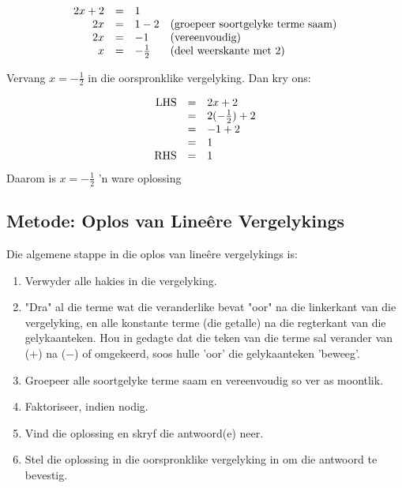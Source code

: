 \begin{equation*}
  \begin{array}{ccll}\hfill 2x+2& =& 1\hfill \\ 
      \hfill 2x& =& 1-2\hfill & \mbox{(groepeer soortgelyke terme saam)}\hfill \\ 
      \hfill 2x& =& -1\hfill & \mbox{(vereenvoudig)}\hfill \\
\hfill x&=& -\frac{1}{2} & \mbox{(deel weerskante met $2$)} \hfill
  \end{array}
\end{equation*}

\begin{equation*}

\end{equation*}
Vervang  $x=-\frac{1}{2}$ in die oorspronklike vergelyking. Dan kry ons:

\begin{equation*}
    \begin{array}{ccl}\hfill \mbox{LHS}& =& 2x+2\hfill \\
	  & =& 2(-\frac{1}{2})+2\hfill \\
	  & =& -1+2\hfill \\
	  & =& 1\hfill \\
	  \hfill \mbox{RHS}& =& 1\hfill \\
    \end{array}
\end{equation*}
Daarom is $x = -\frac{1}{2}$ 'n ware oplossing


\subsection*{Metode: Oplos van Lineêre Vergelykings}

Die algemene stappe in die oplos van lineêre vergelykings is:
\begin{enumerate}[noitemsep, label=\textbf{\arabic*}. ] 
    \item Verwyder alle hakies in die vergelyking.
    \item "Dra" al die terme wat die veranderlike bevat "oor" na die linkerkant van die vergelyking, en alle konstante terme (die getalle) na die regterkant van die gelykaanteken. Hou in gedagte dat die teken van die terme sal verander van (+) na (−) of omgekeerd, soos hulle ’oor’ die gelykaanteken ’beweeg’.
    \item Groepeer alle soortgelyke terme saam en vereenvoudig so ver as moontlik.
\item Faktoriseer, indien nodig.
    \item Vind die oplossing en skryf die antwoord(e) neer.
    \item Stel die oplossing in die oorspronklike vergelyking in om die antwoord te bevestig.
\end{enumerate}

